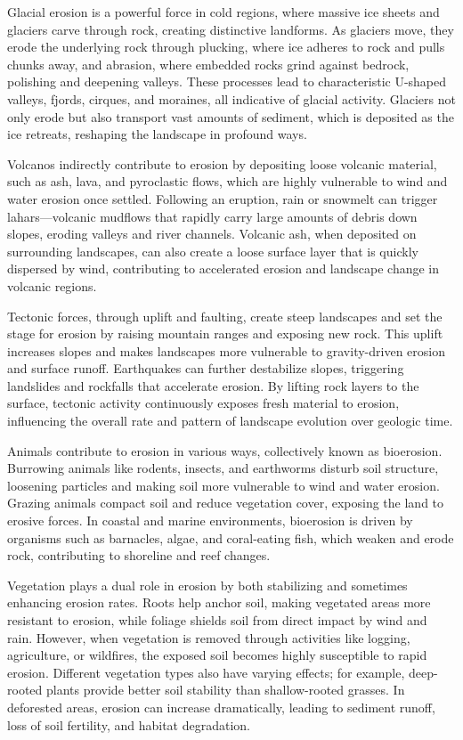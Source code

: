 Glacial erosion is a powerful force in cold regions, where massive ice sheets and glaciers carve through rock, creating distinctive landforms. As glaciers move, they erode the underlying rock through plucking, where ice adheres to rock and pulls chunks away, and abrasion, where embedded rocks grind against bedrock, polishing and deepening valleys. These processes lead to characteristic U-shaped valleys, fjords, cirques, and moraines, all indicative of glacial activity. Glaciers not only erode but also transport vast amounts of sediment, which is deposited as the ice retreats, reshaping the landscape in profound ways.

Volcanos indirectly contribute to erosion by depositing loose volcanic material, such as ash, lava, and pyroclastic flows, which are highly vulnerable to wind and water erosion once settled. Following an eruption, rain or snowmelt can trigger lahars—volcanic mudflows that rapidly carry large amounts of debris down slopes, eroding valleys and river channels. Volcanic ash, when deposited on surrounding landscapes, can also create a loose surface layer that is quickly dispersed by wind, contributing to accelerated erosion and landscape change in volcanic regions.

Tectonic forces, through uplift and faulting, create steep landscapes and set the stage for erosion by raising mountain ranges and exposing new rock. This uplift increases slopes and makes landscapes more vulnerable to gravity-driven erosion and surface runoff. Earthquakes can further destabilize slopes, triggering landslides and rockfalls that accelerate erosion. By lifting rock layers to the surface, tectonic activity continuously exposes fresh material to erosion, influencing the overall rate and pattern of landscape evolution over geologic time.

Animals contribute to erosion in various ways, collectively known as bioerosion. Burrowing animals like rodents, insects, and earthworms disturb soil structure, loosening particles and making soil more vulnerable to wind and water erosion. Grazing animals compact soil and reduce vegetation cover, exposing the land to erosive forces. In coastal and marine environments, bioerosion is driven by organisms such as barnacles, algae, and coral-eating fish, which weaken and erode rock, contributing to shoreline and reef changes.

Vegetation plays a dual role in erosion by both stabilizing and sometimes enhancing erosion rates. Roots help anchor soil, making vegetated areas more resistant to erosion, while foliage shields soil from direct impact by wind and rain. However, when vegetation is removed through activities like logging, agriculture, or wildfires, the exposed soil becomes highly susceptible to rapid erosion. Different vegetation types also have varying effects; for example, deep-rooted plants provide better soil stability than shallow-rooted grasses. In deforested areas, erosion can increase dramatically, leading to sediment runoff, loss of soil fertility, and habitat degradation.


